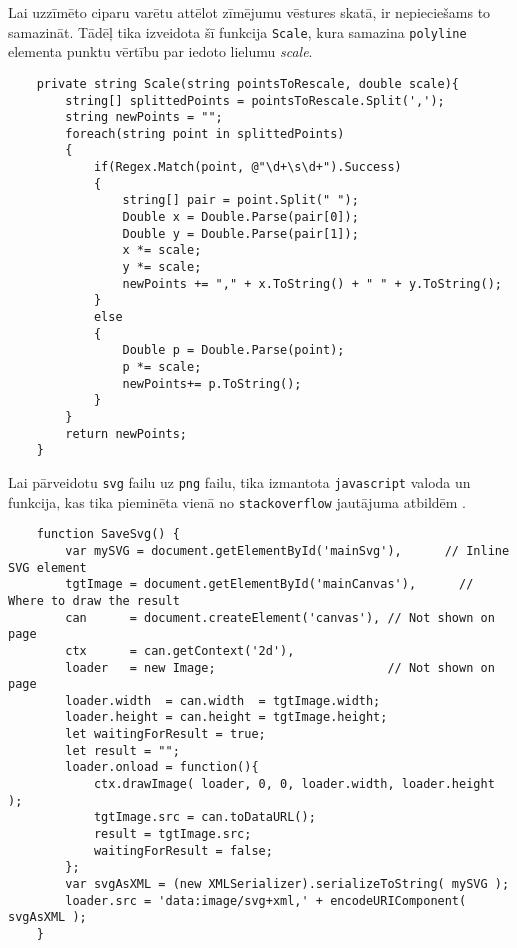 \par Lai uzzīmēto ciparu varētu attēlot zīmējumu vēstures skatā, ir nepieciešams to samazināt. Tādēļ tika izveidota šī funkcija \texttt{Scale}, kura samazina \texttt{polyline} elementa punktu vērtību par iedoto lielumu \textit{scale}.
{
\begin{verbatim}
    private string Scale(string pointsToRescale, double scale){
        string[] splittedPoints = pointsToRescale.Split(',');
        string newPoints = "";
        foreach(string point in splittedPoints)
        {
            if(Regex.Match(point, @"\d+\s\d+").Success)
            {
                string[] pair = point.Split(" ");
                Double x = Double.Parse(pair[0]);
                Double y = Double.Parse(pair[1]);
                x *= scale;
                y *= scale;
                newPoints += "," + x.ToString() + " " + y.ToString();
            }
            else
            {
                Double p = Double.Parse(point);
                p *= scale;
                newPoints+= p.ToString();
            }
        }
        return newPoints;
    }
\end{verbatim}
}

\par Lai pārveidotu \texttt{svg} failu uz \texttt{png} failu, tika izmantota \texttt{javascript} valoda un funkcija, kas tika pieminēta vienā no \texttt{stackoverflow} jautājuma atbildēm \cite{stackoverflow_answer}.

{
\begin{verbatim}
    function SaveSvg() {
        var mySVG = document.getElementById('mainSvg'),      // Inline SVG element
        tgtImage = document.getElementById('mainCanvas'),      // Where to draw the result
        can      = document.createElement('canvas'), // Not shown on page
        ctx      = can.getContext('2d'),
        loader   = new Image;                        // Not shown on page
        loader.width  = can.width  = tgtImage.width;
        loader.height = can.height = tgtImage.height;
        let waitingForResult = true;
        let result = "";
        loader.onload = function(){
            ctx.drawImage( loader, 0, 0, loader.width, loader.height );
            tgtImage.src = can.toDataURL();
            result = tgtImage.src;
            waitingForResult = false;
        };
        var svgAsXML = (new XMLSerializer).serializeToString( mySVG );
        loader.src = 'data:image/svg+xml,' + encodeURIComponent( svgAsXML );
    }
\end{verbatim}
}

